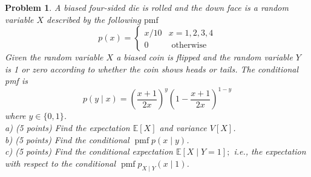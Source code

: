 \documentclass[12pt]{article}
\newtheorem{problem}{Problem}
\begin{document}
\begin{problem}
A biased four-sided die is rolled and the down face is a random variable $X$ described by the following $\mathrm{pmf}$
$$
p(x)=\left\{\begin{array}{ll}
x / 10 & x=1,2,3,4 \\
0 & \text { otherwise }
\end{array}\right.
$$
Given the random variable $X$ a biased coin is flipped and the random variable $Y$ is 1 or zero according to whether the coin shows heads or tails. The conditional pmf is
$$
p(y \mid x)=\left(\frac{x+1}{2 x}\right)^{y}\left(1-\frac{x+1}{2 x}\right)^{1-y}
$$
where $y \in\{0,1\}$.\\
a) (5 points) Find the expectation $\mathbb{E}[X]$ and variance $V[X]$.\\
b) (5 points) Find the conditional $\operatorname{pmf} p(x \mid y)$.\\
c) (5 points) Find the conditional expectation $\mathbb{E}[X \mid Y=1] ;$ i.e., the expectation with respect to the conditional $\operatorname{pmf} p_{X \mid Y}(x \mid 1)$.
\end{problem}
\end{document}
